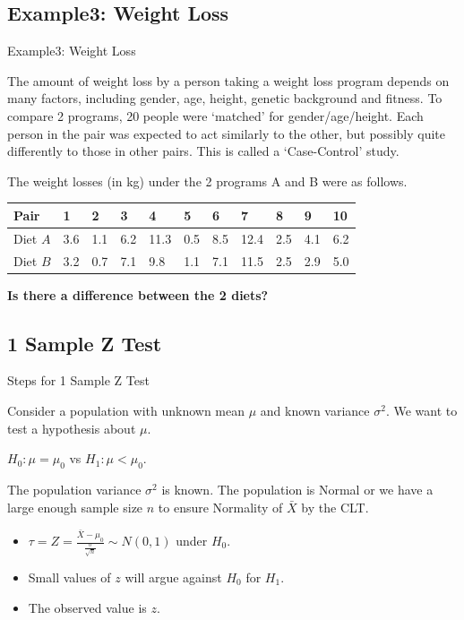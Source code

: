 \documentclass[t,xcolor=pdftex,dvipsnames,table]{beamer}
\begin{document}
\subsection[Example3]{Example3: Weight Loss}
\begin{frame}{Example3: Weight Loss}

The amount of weight loss by a person taking a weight loss program depends on many factors, including gender, age, height, genetic background and fitness.   
To compare 2 programs, 20 people were ‘matched’ for gender/age/height. Each person in the pair was expected to act similarly to the other, but possibly quite differently to those in other pairs. This is called a ‘Case-Control’ study. 

\vspace{.5cm}
The weight losses (in kg) under the 2 programs A and B were as follows.

\vspace{.5cm}
{\small \begin{tabular}{lllllllllll} \hline
Pair & 1 & 2 & 3 & 4 & 5 & 6 & 7 & 8 & 9 & 10 \\ \hline
Diet $A$ & 3.6 & 1.1 & 6.2 & 11.3 & 0.5 & 8.5 & 12.4 & 2.5 & 4.1 & 6.2 \\
Diet $B$ & 3.2 & 0.7 & 7.1 & 9.8 & 1.1 & 7.1 & 11.5 & 2.5 & 2.9 & 5.0 \\  \hline
\end{tabular}}

\vspace{.5cm}
{\bf Is there a difference between the 2 diets?}
\end{frame}


\subsection[Z Test]{1 Sample Z Test}
\begin{frame}[fragile]{Steps for 1 Sample Z Test}

Consider a population with unknown mean $\mu$ and known variance $\sigma^{2}$. We want to test a hypothesis about $\mu$.

\vspace{.5cm}
 $H_{0}: \mu = \mu_{0}$ vs $H_{1}: \mu < \mu_{0}$. 

\vspace{.5cm}
 The population variance $\sigma^{2}$ is known. The population is Normal or we have a large enough sample size $n$ to ensure Normality of $\bar{X}$ by the CLT.

\vspace{.5cm}
\begin{itemize}
\item $\tau = Z = \frac{\bar{X} - \mu_{0}}{\frac{\sigma}{\sqrt{n}}}  \sim N(0,1)$ under $H_{0}$. 
\item Small values of $z$ will argue against $H_{0}$ for $H_{1}$. 
\item The observed value is $z$. 
\end{itemize}

\end{frame}  
\end{document}

